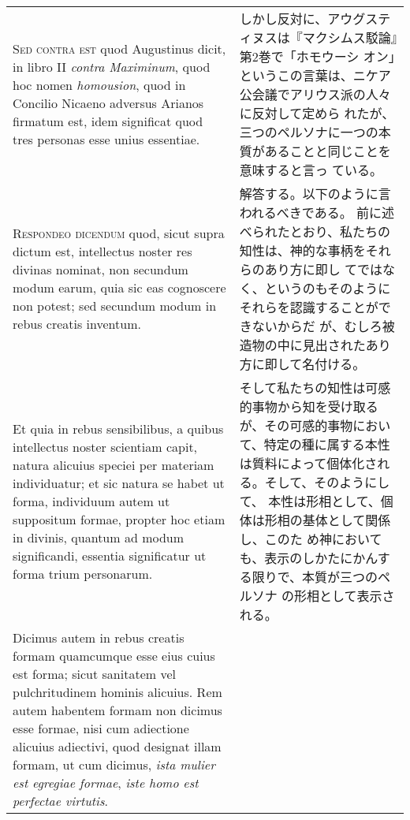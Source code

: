 \documentclass[10pt]{jsarticle} %
\begin{document}
\begin{longtable}{p{21em}p{21em}}
\\



{\scshape Sed contra est} quod Augustinus dicit, in libro II {\itshape contra Maximinum}, quod
hoc nomen {\itshape homousion}, quod in Concilio Nicaeno adversus Arianos firmatum
est, idem significat quod tres personas esse unius essentiae.


&

しかし反対に、アウグスティヌスは『マクシムス駁論』第2巻で「ホモウーシ
 オン」というこの言葉は、ニケア公会議でアリウス派の人々に反対して定めら
 れたが、三つのペルソナに一つの本質があることと同じことを意味すると言っ
 ている。


\\



{\scshape Respondeo dicendum} quod, sicut supra dictum est, intellectus noster res
divinas nominat, non secundum modum earum, quia sic eas cognoscere non
potest; sed secundum modum in rebus creatis inventum. 


&

解答する。以下のように言われるべきである。
前に述べられたとおり、私たちの知性は、神的な事柄をそれらのあり方に即し
 てではなく、というのもそのようにそれらを認識することができないからだ
 が、むしろ被造物の中に見出されたあり方に即して名付ける。


\\


Et quia in rebus
sensibilibus, a quibus intellectus noster scientiam capit, natura
alicuius speciei per materiam individuatur; et sic natura se habet ut
forma, individuum autem ut suppositum formae, propter hoc etiam in
divinis, quantum ad modum significandi, essentia significatur ut forma
trium personarum. 

&

そして私たちの知性は可感的事物から知を受け取るが、その可感的事物におい
 て、特定の種に属する本性は質料によって個体化される。そして、そのようにして、
 本性は形相として、個体は形相の基体として関係し、このた
 め神においても、表示のしかたにかんする限りで、本質が三つのペルソナ
 の形相として表示される。



\\

Dicimus autem in rebus creatis formam quamcumque esse
eius cuius est forma; sicut sanitatem vel pulchritudinem hominis
alicuius. 
Rem autem habentem formam non dicimus esse formae, nisi cum
adiectione alicuius adiectivi, quod designat illam formam, ut cum
dicimus, {\itshape ista mulier est egregiae formae}, {\itshape iste homo est perfectae
virtutis}. 



\end{longtable}
\end{document}
